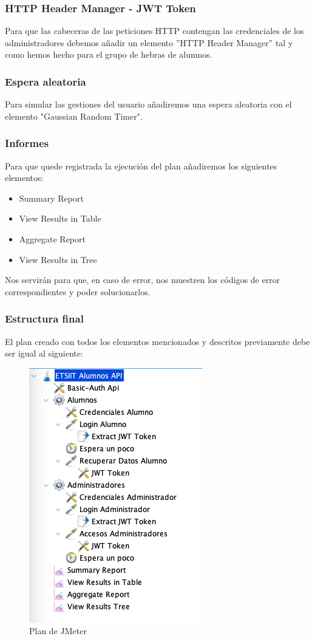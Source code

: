 \subsubsection{HTTP Header Manager - JWT Token}
Para que las cabeceras de las peticiones HTTP contengan las credenciales de los administradores debemos añadir un elemento ''HTTP Header Manager'' tal y como hemos hecho para el
grupo de hebras de alumnos.

\subsubsection{Espera aleatoria}
Para simular las gestiones del usuario añadiremos una espera aleatoria con el elemento "Gaussian Random Timer".

\subsubsection{Informes}
Para que quede registrada la ejecución del plan añadiremos los siguientes elementos:
\begin{itemize}
    \item Summary Report
    \item View Results in Table
    \item Aggregate Report
    \item View Results in Tree
\end{itemize}
Nos servirán para que, en caso de error, nos muestren los códigos de error correspondientes y poder solucionarlos.

\subsubsection{Estructura final}

El plan creado con todos los elementos mencionados y descritos previamente debe ser igual al siguiente:
\begin{figure}[H]
    \centering  
    \includegraphics[scale=0.6]{images/plan.png}
    \caption{Plan de JMeter}
    \label{fig:plan}
\end{figure}

